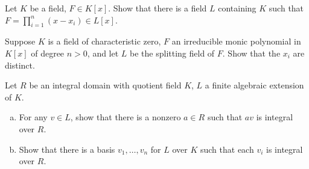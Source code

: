 \documentclass[10pt]{mypackage}
\begin{document}
\begin{exercise}[Exercise 1.52]
  Let $K$ be a field, $F\in K\left[ x \right]$. Show that there is a field $L$ containing $K$ such that $F = \prod_{i=1}^{n}\left( x-x_i \right)\in L\left[ x \right]$.
\end{exercise}
\begin{exercise}[Exercise 1.53]
  Suppose $K$ is a field of characteristic zero, $F$ an irreducible monic polynomial in $K\left[ x \right]$ of degree $n > 0$, and let $L$ be the splitting field of $F$. Show that the $x_i$ are distinct.
\end{exercise}
\begin{exercise}[Exercise 1.54]
  Let $R$ be an integral domain with quotient field $K$, $L$ a finite algebraic extension of $K$.
  \begin{enumerate}[(a)]
    \item For any $v\in L$, show that there is a nonzero $a\in R$ such that $av$ is integral over $R$.
    \item Show that there is a basis $v_1,\dots,v_n$ for $L$ over $K$ such that each $v_i$ is integral over $R$.
  \end{enumerate}
\end{exercise}
\end{document}
